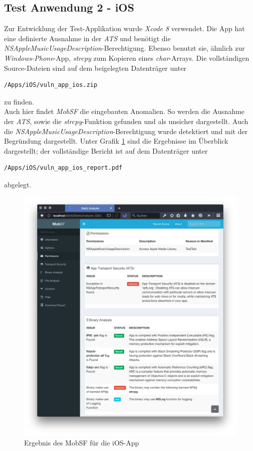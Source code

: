	\subsection{Test Anwendung 2 - iOS}
	Zur Entwicklung der Test-Applikation wurde \textit{Xcode 8} verwendet. Die App hat eine definierte Ausnahme in der \textit{ATS} und benötigt die \textit{NSAppleMusicUsageDescription}-Berechtigung. Ebenso benutzt sie, ähnlich zur \textit{Windows-Phone}-App, \textit{strcpy} zum Kopieren eines \textit{char}-Arrays. Die vollständigen Source-Dateien sind auf dem beigelegten Datenträger unter 
\begin{lstlisting}
/Apps/iOS/vuln_app_ios.zip
\end{lstlisting}
zu finden.\\
	
	Auch hier findet \textit{MobSF} die eingebauten Anomalien. So werden die Ausnahme der \textit{ATS}, sowie die \textit{strcpy}-Funktion gefunden und als unsicher dargestellt. Auch die \textit{NSAppleMusicUsageDescription}-Berechtigung wurde detektiert und mit der Begründung dargestellt. Unter Grafik \ref{fig:PenMobAnwiOSErgebnis} sind die Ergebnisse im Überblick dargestellt; der vollständige Bericht ist auf dem Datenträger unter 
\begin{lstlisting}
/Apps/iOS/vuln_app_ios_report.pdf
\end{lstlisting} abgelegt.
	
\begin{figure}[htbp]
	\centering
	\includegraphics[width=\textwidth]{bilder/pentest_mobile_anwendungen/ergebnis_ios.png}
	\caption{Ergebnis des MobSF für die iOS-App}
	\label{fig:PenMobAnwiOSErgebnis}
\end{figure}